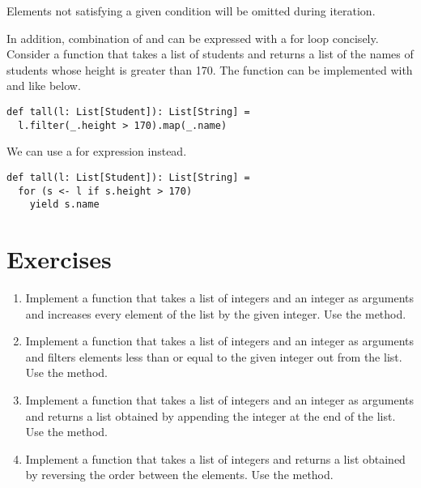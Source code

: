 Elements not satisfying a given condition will be omitted during iteration.

In addition, combination of  and  can be expressed with a
for loop concisely. Consider a function that takes a list of students and
returns a list of the names of students whose height is greater than 170.
The function can be implemented with  and  like below.

\begin{verbatim}
def tall(l: List[Student]): List[String] =
  l.filter(_.height > 170).map(_.name)
\end{verbatim}

We can use a for expression instead.

\begin{verbatim}
def tall(l: List[Student]): List[String] =
  for (s <- l if s.height > 170)
    yield s.name
\end{verbatim}

\section{Exercises}

\begin{enumerate}
  \item
    Implement a function that takes a list of integers and an integer as
    arguments and increases every element of the list by the given integer. Use
    the  method.

  \item
    Implement a function that takes a list of integers and an integer as arguments
    and filters elements less than or equal to the given integer out from the list.
    Use the  method.

  \item
    Implement a function that takes a list of integers and an integer as arguments
    and returns a list obtained by appending the integer at the end of the list.
    Use the  method.

  \item
    Implement a function that takes a list of integers
    and returns a list obtained by reversing the order between the elements.
    Use the  method.
\end{enumerate}
